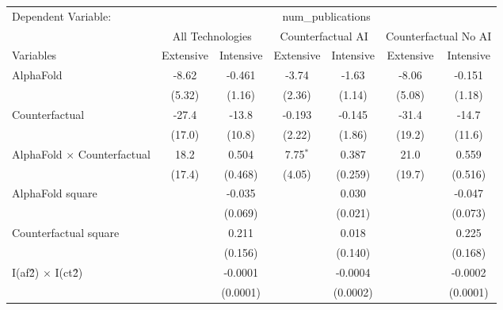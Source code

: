 \begingroup
\centering
\begin{tabular}{lcccccc}
   \tabularnewline \midrule \midrule
   Dependent Variable: & \multicolumn{6}{c}{num\_publications}\\
 & \multicolumn{2}{c}{All Technologies} & \multicolumn{2}{c}{Counterfactual AI} & \multicolumn{2}{c}{Counterfactual No AI} \\
\cmidrule(lr){1-1}\cmidrule(lr){2-3} \cmidrule(lr){4-5} \cmidrule(lr){6-7}
Variables & \multicolumn{1}{c}{Extensive} & \multicolumn{1}{c}{Intensive} & \multicolumn{1}{c}{Extensive} & \multicolumn{1}{c}{Intensive} & \multicolumn{1}{c}{Extensive} & \multicolumn{1}{c}{Intensive} \\
\cmidrule(lr){1-1}\cmidrule(lr){2-2} \cmidrule(lr){3-3} \cmidrule(lr){4-4} \cmidrule(lr){5-5} \cmidrule(lr){6-6} \cmidrule(lr){7-7}
   AlphaFold                          & -8.62   & -0.461   & -3.74      & -1.63    & -8.06   & -0.151\\   
                                      & (5.32)  & (1.16)   & (2.36)     & (1.14)   & (5.08)  & (1.18)\\   
   Counterfactual                     & -27.4   & -13.8    & -0.193     & -0.145   & -31.4   & -14.7\\   
                                      & (17.0)  & (10.8)   & (2.22)     & (1.86)   & (19.2)  & (11.6)\\   
   AlphaFold $\times$ Counterfactual  & 18.2    & 0.504    & 7.75$^{*}$ & 0.387    & 21.0    & 0.559\\   
                                      & (17.4)  & (0.468)  & (4.05)     & (0.259)  & (19.7)  & (0.516)\\   
   AlphaFold square                   &         & -0.035   &            & 0.030    &         & -0.047\\   
                                      &         & (0.069)  &            & (0.021)  &         & (0.073)\\   
   Counterfactual square              &         & 0.211    &            & 0.018    &         & 0.225\\   
                                      &         & (0.156)  &            & (0.140)  &         & (0.168)\\   
   I(af\^2) $\times$ I(ct\^2)         &         & -0.0001  &            & -0.0004  &         & -0.0002\\   
                                      &         & (0.0001) &            & (0.0002) &         & (0.0001)\\   

\end{tabular}
